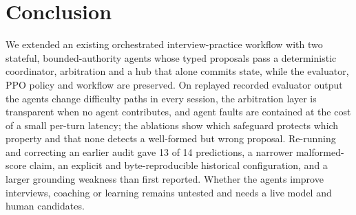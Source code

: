 \section{Conclusion}
We extended an existing orchestrated interview-practice workflow with two stateful, bounded-authority agents whose typed proposals pass a deterministic coordinator, arbitration and a hub that alone commits state, while the evaluator, PPO policy and workflow are preserved. On replayed recorded evaluator output the agents change difficulty paths in every session, the arbitration layer is transparent when no agent contributes, and agent faults are contained at the cost of a small per-turn latency; the ablations show which safeguard protects which property and that none detects a well-formed but wrong proposal. Re-running and correcting an earlier audit gave 13 of 14 predictions, a narrower malformed-score claim, an explicit and byte-reproducible historical configuration, and a larger grounding weakness than first reported. Whether the agents improve interviews, coaching or learning remains untested and needs a live model and human candidates.
